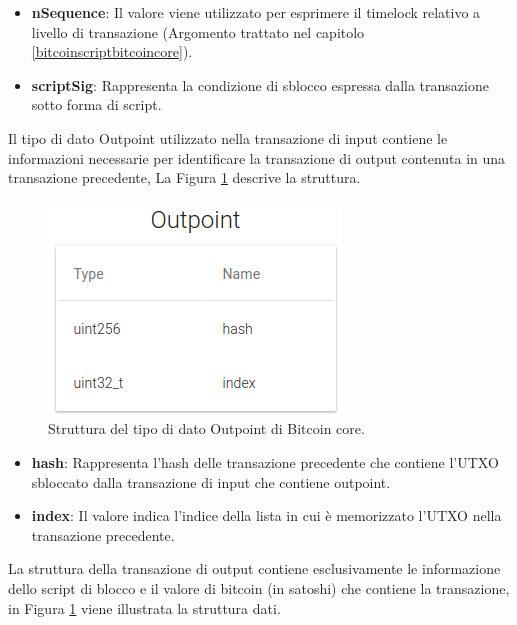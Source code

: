 \begin{itemize}
  \item {\bf nSequence\/}:  Il valore viene utilizzato per esprimere il timelock relativo a livello di transazione (Argomento trattato nel capitolo \ref{bitcoinscriptbitcoincore}).
  \item {\bf scriptSig\/}: Rappresenta la condizione di sblocco espressa dalla transazione sotto forma di script.
\end{itemize}

Il tipo di dato Outpoint utilizzato nella transazione di input contiene le informazioni necessarie per identificare la transazione di output contenuta in una transazione precedente, La Figura \ref{fig:outpointbitcoinc} descrive la struttura.

\begin{figure}[H]
\begin{center}
\includegraphics[width=0.6\columnwidth]{images/bitcoinstructs/outpoint.png}
\end{center}
\caption{Struttura del tipo di dato Outpoint di Bitcoin core.}
\label{fig:outpointbitcoinc}
\end{figure}

\begin{itemize}
  \item {\bf hash\/}:  Rappresenta l’hash delle transazione precedente che contiene l’UTXO sbloccato dalla transazione di input che contiene outpoint.
  \item {\bf index\/}: Il valore indica l’indice della lista in cui è memorizzato l’UTXO nella transazione precedente.
\end{itemize}

La struttura della transazione di output contiene esclusivamente le informazione dello script di blocco e il valore di bitcoin (in satoshi) che contiene la transazione, in Figura \ref{fig:outpointbitcoinc} viene illustrata la struttura dati.

